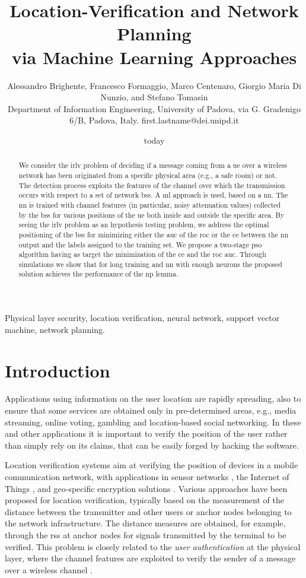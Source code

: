 \documentclass[conference,draftcls,onecolumn]{IEEEtran}
\title{Location-Verification and Network Planning \\ via Machine Learning Approaches}
\author{Alessandro Brighente, Francesco Formaggio, Marco Centenaro, Giorgio Maria Di Nunzio, and    Stefano Tomasin \\ {\small Department of Information Engineering, University of Padova, via G. Gradenigo 6/B, Padova, Italy. first.lastname@dei.unipd.it} }
\date{today}
\begin{document}
\maketitle

\begin{abstract}
We consider the \ac{irlv} problem of deciding if a message coming from a \ac{ue} over a wireless network has been originated from a specific physical area (e.g., a safe room) or not. The detection process exploits the features of the channel over which the transmission occurs with respect to a set of network \acp{bs}. A  \ac{ml} approach is used, based on a \ac{nn}. The \ac{nn} is trained with channel features (in particular, noisy attenuation values) collected by the \acp{bs} for various positions of the \ac{ue} both inside and outside the specific area. By seeing the \ac{irlv} problem as an hypothesis testing problem, we address the optimal positioning of the \acp{bs} for minimizing either the \ac{auc} of the \ac{roc} or  the \ac{ce} between the \ac{nn} output and the labels assigned to the training set. We propose a two-stage \ac{pso} algorithm having as target the  minimization of  the \ac{ce} and  the \ac{roc} \ac{auc}. Through simulations we show that for long training and \ac{nn} with enough neurons the proposed solution achieves the performance of the \ac{np} lemma.
\end{abstract}

\begin{IEEEkeywords}
Physical layer security, location verification, neural network, support vector machine, network planning.
\end{IEEEkeywords}
\glsresetall

\section{Introduction}

Applications using information on the user location are rapidly spreading, also to ensure that some services are obtained only in pre-determined areas, e.g., media streaming, online voting, gambling and location-based social networking. In these and other applications it is important to verify the position of the user rather than simply rely on its claims, that can be easily forged by hacking the software.

Location verification systems aim at verifying the position of devices in a mobile communication network, with applications in sensor networks \cite{Zeng-survey, 8376254}, the Internet of Things \cite{7903611}, and geo-specific encryption solutions \cite{quaglia}. Various approaches have been proposed for location verification, typically based on the measurement of the distance between the transmitter and other users  or  anchor nodes belonging to the network infrastructure. The distance measures are obtained, for example, through the \ac{rss} at anchor nodes for signals transmitted by the terminal to be verified.  This problem is closely related to the {\em user authentication} at the physical layer, where the channel features are exploited to verify the sender of a message over a wireless channel \cite{7270404}.
\end{document}
